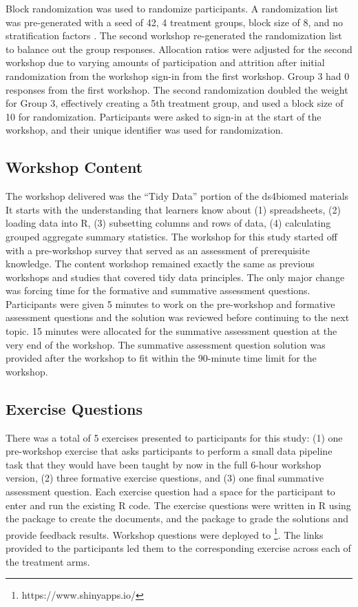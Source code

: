 \documentclass[040-assessment.tex]{subfiles}
\begin{document}
    Block randomization was used to randomize participants.
    A randomization list was pre-generated with a
    seed of 42, 4 treatment groups, block size of 8, and no stratification factors
    \cite{sealedenvelopeltdCreateBlockedRandomisation2021}.
    The second workshop re-generated the randomization list to balance out the group responses.
    Allocation ratios were adjusted for the second workshop due to varying amounts of participation
    and attrition after initial randomization from the workshop sign-in from the first workshop.
    Group 3 had 0 responses from the first workshop.
    The second randomization doubled the weight for Group 3,
    effectively creating a 5th treatment group, and used a block size of 10 for randomization.
    Participants were asked to sign-in at the start of the workshop,
    and their unique identifier was used for randomization.

\subsection{Workshop Content}

    The workshop delivered was  the ``Tidy Data'' portion of the ds4biomed materials %
    It starts with the understanding that learners know about
    (1) spreadsheets,
    (2) loading data into R,
    (3) subsetting columns and rows of data,
    (4) calculating grouped aggregate summary statistics.
    The workshop for this study started off with a pre-workshop survey that served as an assessment of
    prerequisite knowledge.
    The content workshop remained exactly the same as previous workshops and studies
    that covered tidy data principles.
    The only major change was forcing time for the formative and summative assessment questions.
    Participants were given 5 minutes to work on the pre-workshop and formative assessment questions
    and the solution was reviewed before continuing to the next topic.
    15 minutes were allocated for the summative assessment question at the very end of the workshop.
    The summative assessment question solution was provided after the workshop to fit within the
    90-minute time limit for the workshop.

\subsection{Exercise Questions}

There was a total of 5 exercises presented to participants for this study:
(1) one pre-workshop exercise that asks participants to perform a small data pipeline task that they would
    have been taught by now in the full 6-hour workshop version,
(2) three formative exercise questions, and
(3) one final summative assessment question.
Each exercise question had a space for the participant to enter and run the existing R code.
The exercise questions were written in R using the  package to create the documents,
and the  package to grade the solutions and provide feedback results.
Workshop questions were deployed to \footnote{https://www.shinyapps.io/}.
The links provided to the participants led them to the corresponding exercise across each of the treatment arms.
\end{document}
